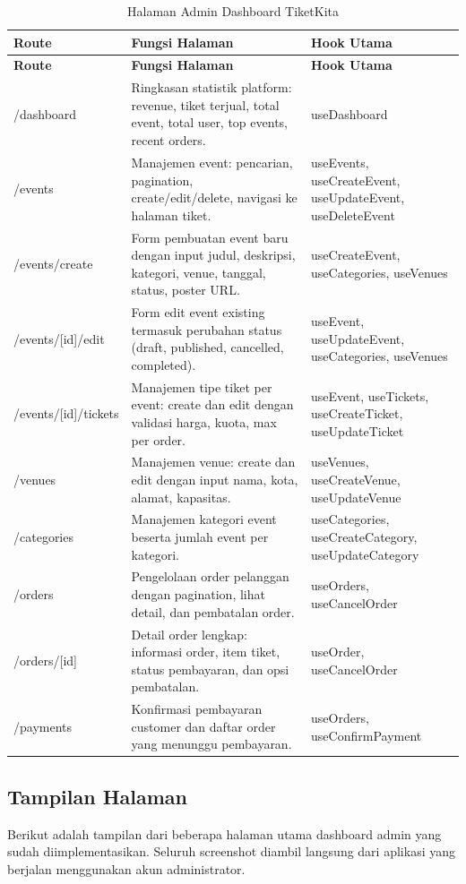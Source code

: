 \documentclass[12pt,a4paper]{report}
\begin{document}
\begin{longtable}{p{4cm} p{6cm} p{4.5cm}}
\caption{Halaman Admin Dashboard TiketKita} \label{tab:halaman-admin} \\
\toprule
\textbf{Route} & \textbf{Fungsi Halaman} & \textbf{Hook Utama} \\
\midrule
\endfirsthead
\toprule
\textbf{Route} & \textbf{Fungsi Halaman} & \textbf{Hook Utama} \\
\midrule
\endhead
\bottomrule
\endfoot
/dashboard              & Ringkasan statistik platform: revenue, tiket terjual, total event, total user, top events, recent orders. & useDashboard \\
/events                 & Manajemen event: pencarian, pagination, create/edit/delete, navigasi ke halaman tiket. & useEvents, useCreateEvent, useUpdateEvent, useDeleteEvent \\
/events/create          & Form pembuatan event baru dengan input judul, deskripsi, kategori, venue, tanggal, status, poster URL. & useCreateEvent, useCategories, useVenues \\
/events/[id]/edit       & Form edit event existing termasuk perubahan status (draft, published, cancelled, completed). & useEvent, useUpdateEvent, useCategories, useVenues \\
/events/[id]/tickets    & Manajemen tipe tiket per event: create dan edit dengan validasi harga, kuota, max per order. & useEvent, useTickets, useCreateTicket, useUpdateTicket \\
/venues                 & Manajemen venue: create dan edit dengan input nama, kota, alamat, kapasitas. & useVenues, useCreateVenue, useUpdateVenue \\
/categories             & Manajemen kategori event beserta jumlah event per kategori. & useCategories, useCreateCategory, useUpdateCategory \\
/orders                 & Pengelolaan order pelanggan dengan pagination, lihat detail, dan pembatalan order. & useOrders, useCancelOrder \\
/orders/[id]            & Detail order lengkap: informasi order, item tiket, status pembayaran, dan opsi pembatalan. & useOrder, useCancelOrder \\
/payments               & Konfirmasi pembayaran customer dan daftar order yang menunggu pembayaran. & useOrders, useConfirmPayment \\
\end{longtable}

\subsection{Tampilan Halaman}
Berikut adalah tampilan dari beberapa halaman utama dashboard admin yang sudah diimplementasikan. Seluruh screenshot diambil langsung dari aplikasi yang berjalan menggunakan akun administrator.
\end{document}
